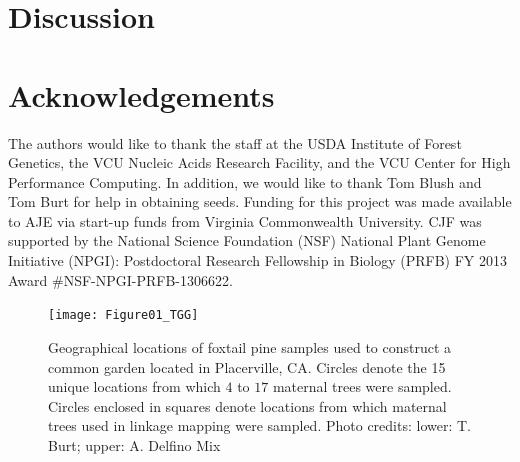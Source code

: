 \documentclass[11pt]{article}
\begin{document}
\section*{Discussion}

\section*{Acknowledgements}

The authors would like to thank the staff at the USDA Institute of Forest Genetics, the 
VCU Nucleic Acids Research Facility, and the VCU Center for High Performance Computing. 
In addition, we would like to thank Tom Blush and Tom Burt for help in obtaining 
seeds. Funding for this project was made available to AJE via start-up funds from Virginia 
Commonwealth University. CJF was supported by the National Science Foundation (NSF) National Plant Genome 
Initiative (NPGI): Postdoctoral Research Fellowship in Biology (PRFB) FY 2013 Award \#NSF-NPGI-PRFB-1306622.

\clearpage

\singlespacing



\clearpage

\begin{figure}[t]
\centering
\texttt{[image: Figure01\_TGG]}
\caption{Geographical locations of foxtail pine samples used to construct a common garden located in Placerville, CA. Circles
denote the 15 unique locations from which $4$ to $17$ maternal trees were sampled. Circles enclosed in squares denote
locations from which maternal trees used in linkage mapping were sampled. Photo credits: lower: T. Burt; upper: A. Delfino Mix}
\label{f:Figure01_TGG}
\end{figure}
\end{document}

